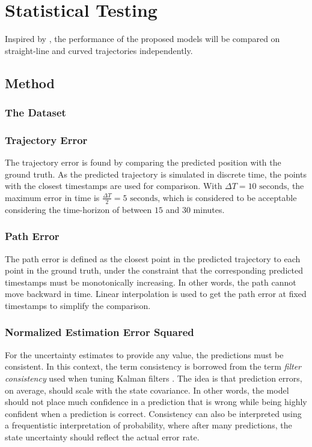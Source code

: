 \chapter{Statistical Testing}\label{chap:stat_testing}
Inspired by \cite{hexeberg}, the performance of the proposed models will be compared on straight-line and curved trajectories independently.

\section{Method}

\subsection{The Dataset}

\subsection{Trajectory Error}
The trajectory error is found by comparing the predicted position with the ground truth. As the predicted trajectory is simulated in discrete time, the points with the closest timestamps are used for comparison. With $\Delta T = 10\text{ seconds}$, the maximum error in time is $\frac{\Delta T}{2} = 5 \text{ seconds}$, which is considered to be acceptable considering the time-horizon of between $15$ and $30$ minutes.
\subsection{Path Error}
The path error is defined as the closest point in the predicted trajectory to each point in the ground truth, under the constraint that the corresponding predicted timestamps must be monotonically increasing. In other words, the path cannot move backward in time. Linear interpolation is used to get the path error at fixed timestamps to simplify the comparison.

\subsection{Normalized Estimation Error Squared}
For the uncertainty estimates to provide any value, the predictions must be consistent. In this context, the term consistency is borrowed from the term \textit{filter consistency} used when tuning Kalman filters \cite{sensorfusjon}. The idea is that prediction errors, on average, should scale with the state covariance. In other words, the model should not place much confidence in a prediction that is wrong while being highly confident when a prediction is correct. Consistency can also be interpreted using a frequentistic interpretation of probability, where after many predictions, the state uncertainty should reflect the actual error rate.

